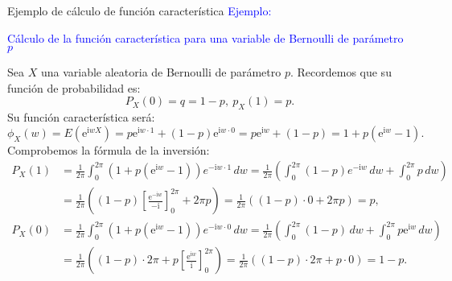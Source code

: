 \documentclass[
  ignorenonframetext,
  aspectratio=169]{beamer}
\newcommand\blue[1]{\textcolor{blue}{#1}}
\begin{document}
\begin{frame}{Ejemplo de cálculo de función característica}
\protect\hypertarget{ejemplo-de-cuxe1lculo-de-funciuxf3n-caracteruxedstica}{}
\blue{Ejemplo:}

\blue{Cálculo de la función característica para una variable de Bernoulli de parámetro $p$}

Sea \(X\) una variable aleatoria de Bernoulli de parámetro \(p\).
Recordemos que su función de probabilidad es: \[
P_X(0)=q=1-p,\ p_X(1)=p.
\] Su función característica será: \[
\phi_X (w)=E\left(\mathrm{e}^{\mathrm{i}wX}\right) =p\mathrm{e}^{\mathrm{i}w\cdot 1}+(1-p)\mathrm{e}^{\mathrm{i}w\cdot 0}=p\mathrm{e}^{\mathrm{i}w}+(1-p)=1+p\left(\mathrm{e}^{\mathrm{i}w} -1 \right).
\] Comprobemos la fórmula de la inversión: \[
\begin{array}{rl}
P_X(1) & = \frac{1}{2\pi}\int_0^{2\pi} \left(1+p\left(\mathrm{e}^{\mathrm{i}w} -1 \right)\right) e^{-\mathrm{i}w\cdot 1}\, dw =\frac{1}{2\pi}\left(\int_0^{2\pi} (1-p)e^{-\mathrm{i}w}\, dw + \int_0^{2\pi} p\, dw\right) \\ & = \frac{1}{2\pi}\left( (1-p) \left[\frac{\mathrm{e}^{-\mathrm{i}w}}{-\mathrm{i}}\right]_0^{2\pi} +2\pi p\right)=\frac{1}{2\pi}\left((1-p)\cdot 0 +2\pi p\right)=p, \\
P_X(0) & = \frac{1}{2\pi}\int_0^{2\pi} \left(1+p\left(\mathrm{e}^{\mathrm{i}w} -1 \right)\right) e^{-\mathrm{i}w\cdot 0}\, dw =\frac{1}{2\pi}\left(\int_0^{2\pi} (1-p) \, dw + \int_0^{2\pi} p \mathrm{e}^{\mathrm{i}w}\, dw\right) \\ & = \frac{1}{2\pi}\left( (1-p) \cdot 2\pi  +p \left[\frac{\mathrm{e}^{\mathrm{i}w}}{\mathrm{i}}\right]_0^{2\pi}\right)=\frac{1}{2\pi}\left((1-p)\cdot 2\pi + p\cdot 0\right)=1-p.
\end{array}
\]
\end{frame}
\end{document}
